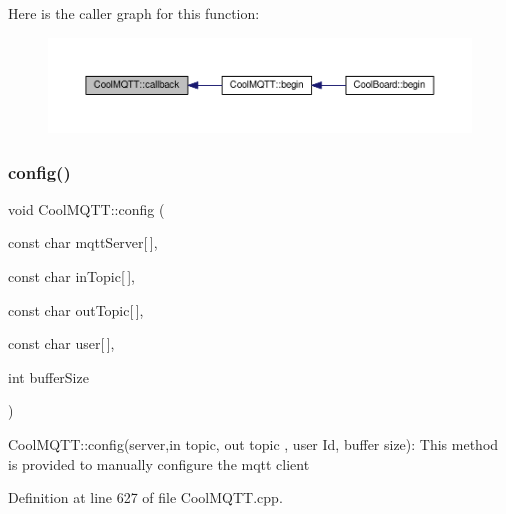Here is the caller graph for this function\+:\nopagebreak
\begin{figure}[H]
\begin{center}
\leavevmode
\includegraphics[width=350pt]{d0/dd0/class_cool_m_q_t_t_a30d82ad665bfb603f46ecdbc290775df_icgraph}
\end{center}
\end{figure}
\mbox{\label{class_cool_m_q_t_t_a9b703de4f1358f0ee7a5e8c44979c648}} 
\subsubsection{\texorpdfstring{config()}{config()}\hspace{0.1cm}{\footnotesize\ttfamily [1/2]}}
{\footnotesize\ttfamily void Cool\+M\+Q\+T\+T\+::config (\begin{DoxyParamCaption}\item[{const char}]{mqtt\+Server\mbox{[}$\,$\mbox{]},  }\item[{const char}]{in\+Topic\mbox{[}$\,$\mbox{]},  }\item[{const char}]{out\+Topic\mbox{[}$\,$\mbox{]},  }\item[{const char}]{user\mbox{[}$\,$\mbox{]},  }\item[{int}]{buffer\+Size }\end{DoxyParamCaption})}

Cool\+M\+Q\+T\+T\+::config(server,in topic, out topic , user Id, buffer size)\+: This method is provided to manually configure the mqtt client 

Definition at line 627 of file Cool\+M\+Q\+T\+T.\+cpp.



